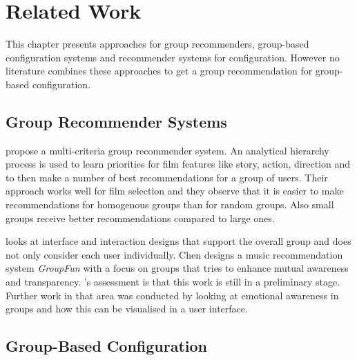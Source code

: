 \chapter{Related Work}
\label{ch:Related_Work}

This chapter presents approaches for group recommenders, group-based configuration systems and recommender systems for configuration. However no literature combines these approaches to get a group recommendation for group-based configuration.

\section{Group Recommender Systems}
\label{sec:Related_Work:GroupRecommender}

\begin{description}[style=unboxed, leftmargin=0cm, font=\normalfont]
    \item[\citeauthor{choudharyMulticriteriaGroupRecommender2020} \cite{choudharyMulticriteriaGroupRecommender2020}] propose a multi-criteria group recommender system. An analytical hierarchy process is used to learn priorities for film features like story, action, direction and to then make a number of best recommendations for a group of users. Their approach works well for film selection and they observe that it is easier to make recommendations for homogenous groups than for random groups. Also small groups receive better recommendations compared to large ones.

    \item[\citeauthor{chenInterfaceInteractionDesign2011} \cite{chenInterfaceInteractionDesign2011}] looks at interface and interaction designs that support the overall group and does not only consider each user individually. Chen designs a music recommendation system \emph{GroupFun} with a focus on groups that tries to enhance mutual awareness and transparency. \citeauthor{chenInterfaceInteractionDesign2011}'s assessment is that this work is still in a preliminary stage. Further work in that area was conducted by \citeauthor{chenEmpatheticonsDesigningEmotion2014} \cite{chenEmpatheticonsDesigningEmotion2014} looking at emotional awareness in groups and how this can be visualised in a user interface. 
\end{description}

\section{Group-Based Configuration}
\label{sec:Related_Work:GroupBasedConfiguration}

